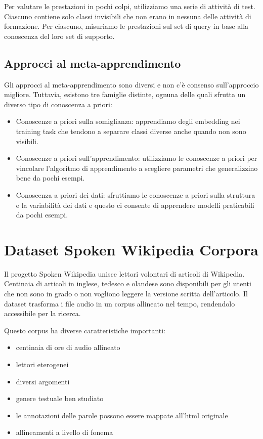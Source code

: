 \documentclass[12pt,a4paper,titlepage]{article}
\begin{document}
Per valutare le prestazioni in pochi colpi, utilizziamo una serie di attività di test. Ciascuno contiene solo classi invisibili che non erano in nessuna delle attività di formazione. Per ciascuno, misuriamo le prestazioni sul set di query in base alla conoscenza del loro set di supporto.

\subsection{Approcci al meta-apprendimento}
Gli approcci al meta-apprendimento sono diversi e non c'è consenso sull'approccio migliore. Tuttavia, esistono tre famiglie distinte, ognuna delle quali sfrutta un diverso tipo di conoscenza a priori:
\begin{itemize}
	\item Conoscenze a priori sulla somiglianza: apprendiamo degli embedding nei training task che tendono a separare classi diverse anche quando non sono visibili.
	\item Conoscenze a priori sull'apprendimento: utilizziamo le conoscenze a priori per vincolare l'algoritmo di apprendimento a scegliere parametri che generalizzino bene da pochi esempi.
	\item Conoscenza a priori dei dati: sfruttiamo le conoscenze a priori sulla struttura e la variabilità dei dati e questo ci consente di apprendere modelli praticabili da pochi esempi.
\end{itemize}

\clearpage

\section{Dataset Spoken Wikipedia Corpora}
\label{sec:spoken_wikipedia_corpora}
Il progetto Spoken Wikipedia unisce lettori volontari di articoli di Wikipedia. Centinaia di articoli in inglese, tedesco e olandese sono disponibili per gli utenti che non sono in grado o non vogliono leggere la versione scritta dell'articolo. Il dataset trasforma i file audio in un corpus allineato nel tempo, rendendolo accessibile per la ricerca.\cite{minining_spoken_wikipedia}

Questo corpus ha diverse caratteristiche importanti:
\begin{itemize}
	\item centinaia di ore di audio allineato
	\item lettori eterogenei
	\item diversi argomenti
	\item genere testuale ben studiato
	\item le annotazioni delle parole possono essere mappate all'html originale
	\item allineamenti a livello di fonema
\end{itemize}
\end{document}
